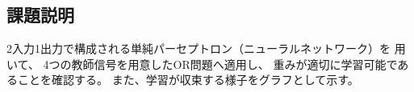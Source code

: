 \subsection{課題説明}
2入力1出力で構成される単純パーセプトロン（ニューラルネットワーク）を
用いて、
4つの教師信号を用意したOR問題へ適用し、
重みが適切に学習可能であることを確認する。
また、学習が収束する様子をグラフとして示す。


